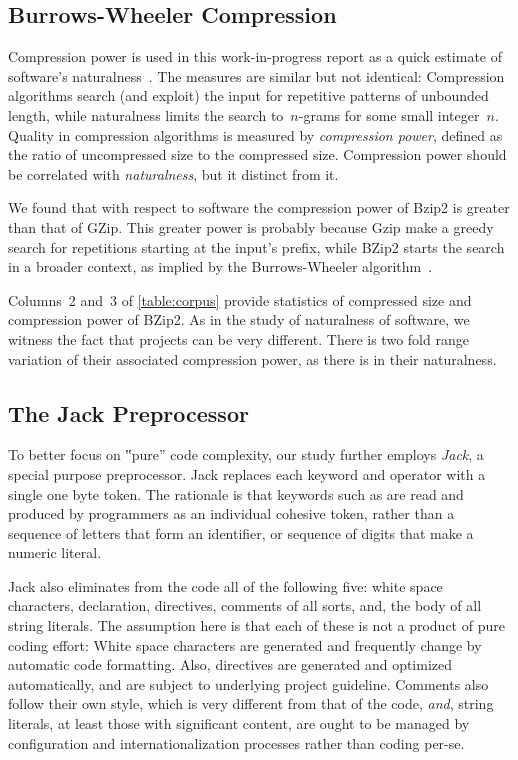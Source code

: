 \subsection{Burrows-Wheeler Compression}
Compression power is used in this work-in-progress report as a quick estimate
of software's naturalness~\cite{Hindle:Bar:Su:Gabel:Devanbu:12}. The
measures are similar but not identical: Compression algorithms search
(and exploit) the input for repetitive patterns of unbounded length, while
naturalness limits the search to~$n$-grams for some small integer~$n$. Quality
in compression algorithms is measured by \emph{compression power}, defined as
the ratio of uncompressed size to the compressed size. Compression power should
be correlated with \emph{naturalness}, but it distinct from it.

We found that with respect to \Java software the compression power of Bzip2 is
greater than that of GZip. This greater power is probably because Gzip make a
greedy search for repetitions starting at the input's prefix, while BZip2
starts the search in a broader context, as implied by the Burrows-Wheeler
algorithm~\cite{Burrows:Wheeler:94}.

Columns~2 and~3 of \cref{table:corpus} provide statistics of compressed size
and compression power of BZip2. As in the study of
naturalness of software, we witness the fact that projects can be very
different. There is two fold range variation of their associated compression
power, as there is in their naturalness.

\subsection{The Jack Preprocessor}

To better focus on ‟pure” code complexity, our study further employs
\emph{Jack}, a special purpose preprocessor. Jack replaces each keyword and
operator with a single one byte token. The rationale is that keywords such as
 are read and produced by programmers as an individual cohesive
token, rather than a sequence of letters that form an identifier, or sequence
of digits that make a numeric literal.

Jack also eliminates from the \Java code all of the following five: white space
characters,  declaration,  directives, comments of all
sorts, and, the body of all string literals. The assumption here is that each
of these is not a product of pure coding effort: White space characters are
generated and frequently change by automatic code formatting. Also, 
directives are generated and optimized automatically, and are subject to
underlying project guideline. Comments also follow their own style, which is
very different from that of the code, \emph{and}, string literals, at least
those with significant content, are ought to be managed by configuration and
internationalization processes rather than coding per-se.

